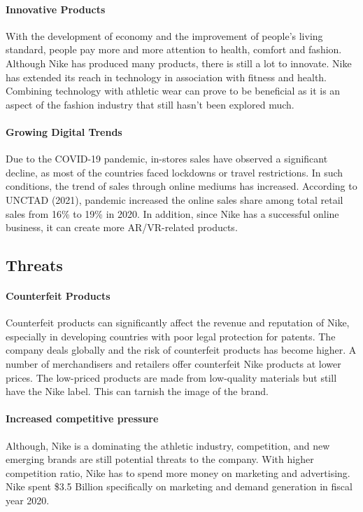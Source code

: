 \documentclass[a4paper, 12pt]{report}
\begin{document}
\paragraph{Innovative Products}
With the development of economy and the improvement of people's living standard, people pay more and more attention to health, comfort and fashion. Although Nike has produced many products, there is still a lot to innovate. Nike has extended its reach in technology in association with fitness and health. Combining technology with athletic wear can prove to be beneficial as it is an aspect of the fashion industry that still hasn’t been explored much.
\paragraph{Growing Digital Trends}
Due to the COVID-19 pandemic, in-stores sales have observed a significant decline, as most of the countries faced lockdowns or travel restrictions. In such conditions, the trend of sales through online mediums has increased. According to UNCTAD (2021), pandemic increased the online sales share among total retail sales from 16\% to 19\% in 2020. In addition, since Nike has a successful online business, it can create more AR/VR-related products.
\subsection{Threats}
\paragraph{Counterfeit Products}
Counterfeit products can significantly affect the revenue and reputation of Nike, especially in developing countries with poor legal protection for patents. The company deals globally and the risk of counterfeit products has become higher. A number of merchandisers and retailers offer counterfeit Nike products at lower prices. The low-priced products are made from low-quality materials but still have the Nike label. This can tarnish the image of the brand.
\paragraph{Increased competitive pressure}
Although, Nike is a dominating the athletic industry, competition, and new emerging brands are still potential threats to the company. With higher competition ratio, Nike has to spend more money on marketing and advertising. Nike spent \$3.5 Billion specifically on marketing and demand generation in fiscal year 2020. 
\end{document}
